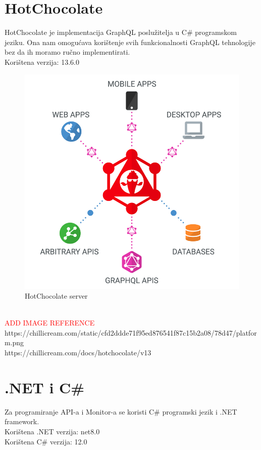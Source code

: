\documentclass[zavrsnirad]{fer}
\begin{document}
\section{HotChocolate}
\label{pog:hotchocolate}
HotChocolate je implementacija GraphQL poslužitelja u C\# programskom jeziku. Ona nam omogućava korištenje svih funkcionalnosti GraphQL tehnologije bez da ih moramo ručno implementirati.\\Korištena verzija: 13.6.0
\begin{figure}[htb]
	\centering
	\includegraphics[width=0.6\linewidth]{images/hot_chocolate.png} 
	\caption{HotChocolate server}
	\label{slk:hot_chooclate}
\end{figure}
\\\textcolor{red}{ADD IMAGE REFERENCE} https://chillicream.com/static/cfd2ddde71f95ed876541f87c15b2a08/78d47/platform.png\\https://chillicream.com/docs/hotchocolate/v13

\section{.NET i C\#}
Za programiranje API-a i Monitor-a se koristi C\# programski jezik i .NET framework.\\
Korištena .NET verzija: net8.0\\Korištena C\# verzija: 12.0
\end{document}
